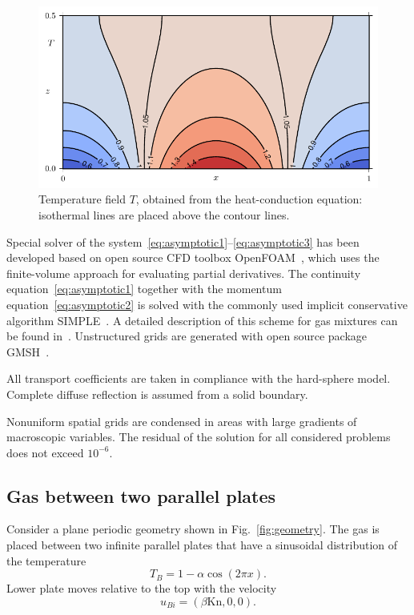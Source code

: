 \documentclass[smallextended, referee]{svjour3} %
\newcommand{\Kn}{\mathrm{Kn}}
\begin{document}
\begin{figure}[ht]
	\centering
	\includegraphics{Fig4}
	\caption{Temperature field \(T\), obtained from the heat-conduction equation:
		isothermal lines are placed above the contour lines.}
	\label{fig:moving:T_heat}
\end{figure}

Special solver of the system~\eqref{eq:asymptotic1}--\eqref{eq:asymptotic3}
has been developed based on open source CFD toolbox OpenFOAM\textregistered{}~\cite{OpenFOAM1998},
which uses the finite-volume approach for evaluating partial derivatives.
The continuity equation~\eqref{eq:asymptotic1} together with the momentum equation~\eqref{eq:asymptotic2}
is solved with the commonly used implicit conservative algorithm SIMPLE~\cite{SIMPLE}.
A detailed description of this scheme for gas mixtures can be found in~\cite{Laneryd2007}.
Unstructured grids are generated with open source package GMSH~\cite{GMSH}.

All transport coefficients are taken in compliance with the hard-sphere model.
Complete diffuse reflection is assumed from a solid boundary.

Nonuniform spatial grids are condensed in areas with large gradients of macroscopic variables.
The residual of the solution for all considered problems does not exceed \(10^{-6}\).

\subsection{Gas between two parallel plates}

Consider a plane periodic geometry shown in Fig.~\ref{fig:geometry}.
The gas is placed between two infinite parallel plates
that have a sinusoidal distribution of the temperature
\begin{equation}
	T_B = 1-\alpha\cos(2\pi x).
\end{equation}
Lower plate moves relative to the top with the velocity
\begin{equation}
	u_{Bi} = (\beta\Kn,0,0).
\end{equation}
\end{document}
